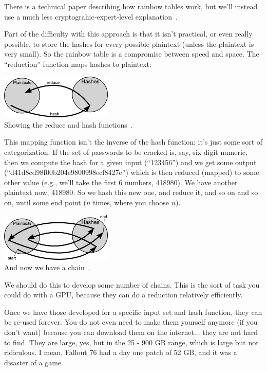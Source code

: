 \documentclass[a4paper]{report}
\begin{document}
There is a technical paper describing how rainbow tables work, but we'll instead use a much less cryptograhic-expert-level explanation~\cite{rainbowtables}. 

Part of the difficulty with this approach is that it isn't practical, or even really possible, to store the hashes for every possible plaintext (unless the plaintext is very small). So the rainbow table is a compromise between speed and space. The ``reduction'' function maps hashes to plaintext:

\begin{center}
	\includegraphics[width=0.4\textwidth]{images/rainbow-tables-reduce.png}\\
	Showing the reduce and hash functions~\cite{rainbowtables}.
\end{center}

This mapping function isn't the inverse of the hash function; it's just some sort of categorization. If the set of passwords to be cracked is, say, six digit numeric, then we compute the hash for a given input (``123456'') and we get some output (``d41d8cd98f00b204e9800998ecf8427e'') which is then reduced (mapped) to some other value (e.g., we'll take the first 6 numbers, 418980). We have another plaintext now, 418980. So we hash this new one, and reduce it, and so on and so on, until some end point ($n$ times, where you choose $n$). 

\begin{center}
	\includegraphics[width=0.4\textwidth]{images/rainbow-tables-chain.png}\\
	And now we have a chain~\cite{rainbowtables}.
\end{center}

We should do this to develop some number of chains. This is the sort of task you could do with a GPU, because they can do a reduction relatively efficiently. 

Once we have those developed for a specific input set and hash function, they can be re-used forever. You do not even need to make them yourself anymore (if you don't want) because you can download them on the internet... they are not hard to find. They are large, yes, but in the 25 - 900 GB range, which is large  but not ridiculous. I mean, Fallout 76 had a day one patch of 52 GB, and it was a disaster of a game.
\end{document}
